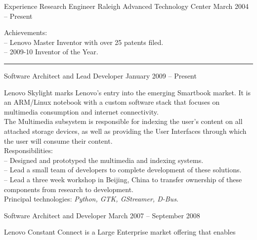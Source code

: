 \documentclass[letterpaper, 11pt]{article}
\begin{document}
    \begin{resume}
        \begin{category}{Experience}
                                         {Research Engineer}
                     {Raleigh Advanced Technology Center} {March 2004 -- Present}
            \par
            Achievements: \\
            -- Lenovo Master Inventor with over 25 patents filed. \\
            -- 2009-10 Inventor of the Year. \\
            \rule{\textwidth}{1pt}
            \begin{block}
                 {Software Architect and Lead Developer}
                         { }               {January 2009 -- Present}
                \par
                Lenovo Skylight marks Lenovo's entry into the emerging Smartbook market.
                It is an ARM/Linux notebook with a custom software stack that focuses
                on multimedia consumption and internet connectivity.
                \\[1ex]
                The Multimedia subsystem is responsible for indexing the user's content on all
                attached storage devices, as well as providing the User Interfaces through which
                the user will consume their content.
                \\[1ex]
                Responsibilities: \\
                -- Designed and prototyped the multimedia and indexing systems. \\
                -- Lead a small team of developers to complete development of these solutions. \\
                -- Lead a three week workshop in Beijing, China to transfer ownership of these components from research to development.
                \\[1ex]
                Principal technologies: \emph{Python, GTK, GStreamer, D-Bus}.
            \end{block}
            \begin{block}
                 {Software Architect and Developer}
                         { }                       {March 2007 -- September 2008}
                \par
                Lenovo Constant Connect is a Large Enterprise market offering that enables

\end{block}
\end{category}
\end{resume}
\end{document}
